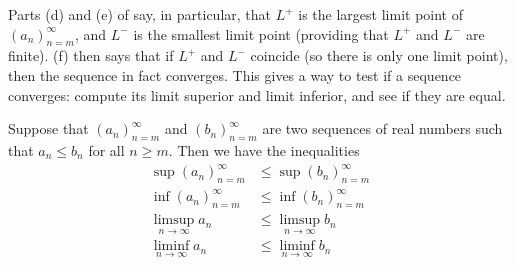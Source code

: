 \begin{note}
  Parts (d) and (e) of  say, in particular, that \(L^+\) is the largest limit point of \((a_n)_{n = m}^\infty\), and \(L^-\) is the smallest limit point
  (providing that \(L^+\) and \(L^-\) are finite).
   (f) then says that if \(L^+\) and \(L^-\) coincide (so there is only one limit point), then the sequence in fact converges.
  This gives a way to test if a sequence converges: compute its limit superior and limit inferior, and see if they are equal.
\end{note}

\begin{lem}\label{i:6.4.13}
  Suppose that \((a_n)_{n = m}^\infty\) and \((b_n)_{n = m}^\infty\) are two sequences of real numbers such that \(a_n \leq b_n\) for all \(n \geq m\).
  Then we have the inequalities
  \begin{align*}
    \sup(a_n)_{n = m}^\infty   & \leq \sup(b_n)_{n = m}^\infty   \\
    \inf(a_n)_{n = m}^\infty   & \leq \inf(b_n)_{n = m}^\infty   \\
    \limsup_{n \to \infty} a_n & \leq \limsup_{n \to \infty} b_n \\
    \liminf_{n \to \infty} a_n & \leq \liminf_{n \to \infty} b_n
  \end{align*}
\end{lem}

